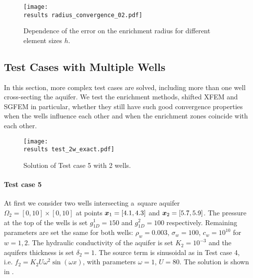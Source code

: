 \begin{figure}[!htb]
  \centering    
  \texttt{[image: \\results radius\_convergence\_02.pdf]}
  \caption[Optimal enrichment radius.]{Dependence of the error on the enrichment radius for different
  element sizes $h$.}
  \label{fig:radius_conv_2}
\end{figure}


\subsection{Test Cases with Multiple Wells}
In this section, more complex test cases are solved, including more than one well cross-secting the aquifer.
We test the enrichment methods, shifted XFEM and SGFEM in particular, whether they
still have such good convergence properties when the wells influence each other and when the enrichment zones coincide with each other.

%
\begin{figure}[!htb]
  \centering    
    \texttt{[image: \\results test\_2w\_exact.pdf]}
  \caption{Solution of Test case 5 with 2 wells. }
  \label{fig:test_2w_exact}
\end{figure}
\paragraph{Test case 5}
At first we consider two wells intersecting a~square aquifer $\Omega_2 = [0,10]\times[0, 10]$ at points $\mathbf{\boldsymbol{x}}_1 = [4.1, 4.3]$ and $\mathbf{\boldsymbol{x}}_2 = [5.7, 5.9]$.
The pressure at the top of the wells is set $g^1_{1D}=150$ and $g^2_{1D}=100$ respectively.
Remaining parameters are set the same for both wells: $\rho_w = 0.003$, $\sigma_w = 100$, $c_w = 10^{10}$ for $w=1,2$.
The hydraulic conductivity of the aquifer is set $K_2=10^{-3}$ and the aquifers thickness is set $\delta_2=1$.
The source term is sinusoidal as in Test case 4, i.e. $f_2 = K_2U\omega^2\sin(\omega x)$, with parameters $\omega=1$, $U=80$.
The solution is shown in .

